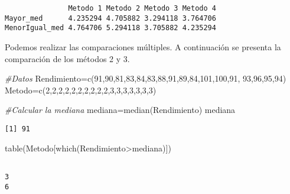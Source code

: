 \documentclass[
  a4paper,
  oneside,
  openany]{book}
\newenvironment{Shaded}{\begin{snugshade}}{\end{snugshade}}
\newcommand{\CommentTok}[1]{\textcolor[rgb]{0.56,0.35,0.01}{\textit{#1}}}
\newcommand{\DecValTok}[1]{\textcolor[rgb]{0.00,0.00,0.81}{#1}}
\newcommand{\FunctionTok}[1]{\textcolor[rgb]{0.00,0.00,0.00}{#1}}
\newcommand{\NormalTok}[1]{#1}
\newcommand{\OtherTok}[1]{\textcolor[rgb]{0.56,0.35,0.01}{#1}}
\newcommand{\SpecialCharTok}[1]{\textcolor[rgb]{0.00,0.00,0.00}{#1}}
\begin{document}
\begin{verbatim}
               Metodo 1 Metodo 2 Metodo 3 Metodo 4
Mayor_med      4.235294 4.705882 3.294118 3.764706
MenorIgual_med 4.764706 5.294118 3.705882 4.235294
\end{verbatim}

Podemos realizar las comparaciones múltiples. A continuación se presenta la comparación de los métodos 2 y 3.

\begin{Shaded}
\begin{Highlighting}[]
\CommentTok{\#Datos}
\NormalTok{Rendimiento}\OtherTok{=}\FunctionTok{c}\NormalTok{(}\DecValTok{91}\NormalTok{,}\DecValTok{90}\NormalTok{,}\DecValTok{81}\NormalTok{,}\DecValTok{83}\NormalTok{,}\DecValTok{84}\NormalTok{,}\DecValTok{83}\NormalTok{,}\DecValTok{88}\NormalTok{,}\DecValTok{91}\NormalTok{,}\DecValTok{89}\NormalTok{,}\DecValTok{84}\NormalTok{,}\DecValTok{101}\NormalTok{,}\DecValTok{100}\NormalTok{,}\DecValTok{91}\NormalTok{,}
              \DecValTok{93}\NormalTok{,}\DecValTok{96}\NormalTok{,}\DecValTok{95}\NormalTok{,}\DecValTok{94}\NormalTok{)}
\NormalTok{Metodo}\OtherTok{=}\FunctionTok{c}\NormalTok{(}\DecValTok{2}\NormalTok{,}\DecValTok{2}\NormalTok{,}\DecValTok{2}\NormalTok{,}\DecValTok{2}\NormalTok{,}\DecValTok{2}\NormalTok{,}\DecValTok{2}\NormalTok{,}\DecValTok{2}\NormalTok{,}\DecValTok{2}\NormalTok{,}\DecValTok{2}\NormalTok{,}\DecValTok{2}\NormalTok{,}\DecValTok{3}\NormalTok{,}\DecValTok{3}\NormalTok{,}\DecValTok{3}\NormalTok{,}\DecValTok{3}\NormalTok{,}\DecValTok{3}\NormalTok{,}\DecValTok{3}\NormalTok{,}\DecValTok{3}\NormalTok{)}

\CommentTok{\#Calcular la mediana}
\NormalTok{mediana}\OtherTok{=}\FunctionTok{median}\NormalTok{(Rendimiento)}
\NormalTok{mediana}
\end{Highlighting}
\end{Shaded}

\begin{verbatim}
[1] 91
\end{verbatim}

\begin{Shaded}
\begin{Highlighting}[]
\FunctionTok{table}\NormalTok{(Metodo[}\FunctionTok{which}\NormalTok{(Rendimiento}\SpecialCharTok{\textgreater{}}\NormalTok{mediana)])}
\end{Highlighting}
\end{Shaded}

\begin{verbatim}

3 
6 
\end{verbatim}
\end{document}
